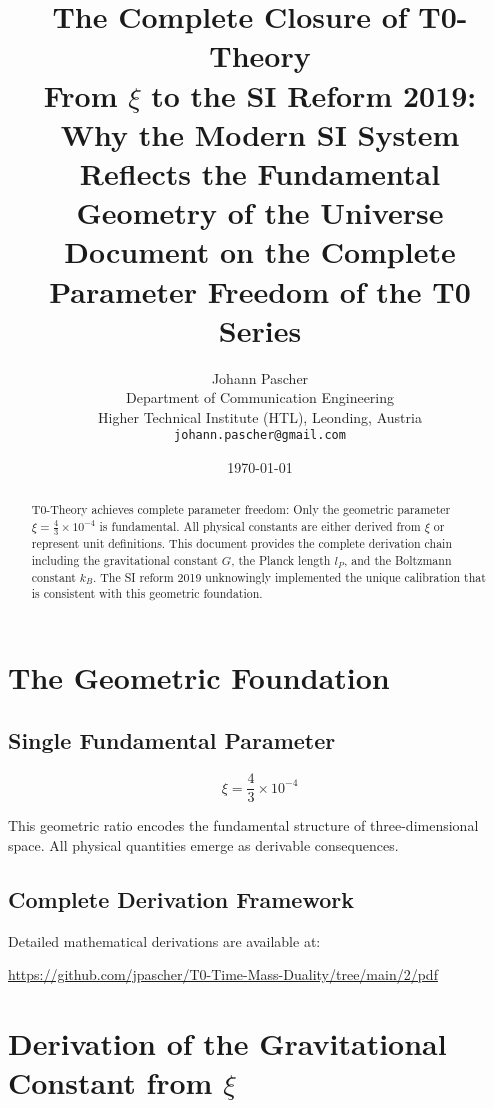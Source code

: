 \documentclass[12pt,a4paper]{article}
\title{\textbf{The Complete Closure of T0-Theory}\\[0.5cm]
	\large From $\xi$ to the SI Reform 2019:\\
	Why the Modern SI System Reflects the Fundamental Geometry of the Universe\\[0.3cm]
	\normalsize Document on the Complete Parameter Freedom of the T0 Series}
\author{Johann Pascher\\
	Department of Communication Engineering\\
	Higher Technical Institute (HTL), Leonding, Austria\\
	\texttt{johann.pascher@gmail.com}}
\date{\today}
\begin{document}
	
	\maketitle
	
	\begin{abstract}
		T0-Theory achieves complete parameter freedom: Only the geometric parameter $\xi = \frac{4}{3} \times 10^{-4}$ is fundamental. All physical constants are either derived from $\xi$ or represent unit definitions. This document provides the complete derivation chain including the gravitational constant $G$, the Planck length $l_P$, and the Boltzmann constant $k_B$. The SI reform 2019 unknowingly implemented the unique calibration that is consistent with this geometric foundation.
	\end{abstract}
	
	\tableofcontents
	\newpage
	
	\section{The Geometric Foundation}
	
	\subsection{Single Fundamental Parameter}
	
	\begin{equation}
		\boxed{\xi = \frac{4}{3} \times 10^{-4}}
	\end{equation}
	
	This geometric ratio encodes the fundamental structure of three-dimensional space. All physical quantities emerge as derivable consequences.
	
	\subsection{Complete Derivation Framework}
	
	Detailed mathematical derivations are available at:
	
	\begin{center}
		\url{https://github.com/jpascher/T0-Time-Mass-Duality/tree/main/2/pdf}
	\end{center}
	
	\section{Derivation of the Gravitational Constant from $\xi$}
	
\end{document}
